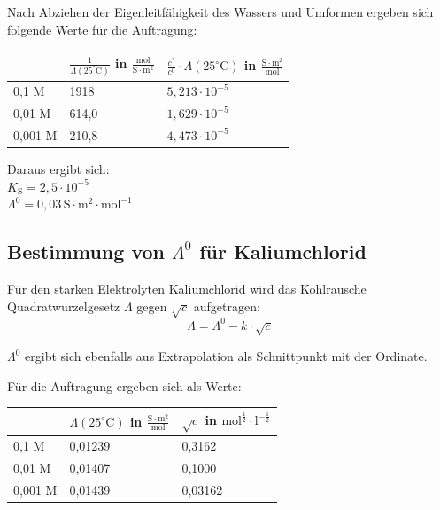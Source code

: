 \documentclass[12pt,a4paper,titlepage,headinclude,bibtotoc]{scrartcl}
\begin{document}
Nach Abziehen der Eigenleitfähigkeit des Wassers und Umformen ergeben sich folgende Werte für die Auftragung:\\

\begin{table} [h]
\centering 
\begin{tabular}{|p{4cm}||p{4cm}|p{4cm}|}
\hline
& $\frac{1}{\Lambda(25^\circ\text{C})}$ in $\frac{\mathrm{mol}}{\mathrm{S} \cdot \mathrm{m^2}}$ & $\frac{c^*}{c^0} \cdot \Lambda(25^\circ\text{C})$ in $\frac{\mathrm{S} \cdot \mathrm{m^2}}{\mathrm{mol}}$\\
\hline
0,1 M & 1918 & $5,213 \cdot 10^{-5}$  \\
\hline
0,01 M & 614,0 & $1,629 \cdot 10^{-5}$  \\
\hline
0,001 M & 210,8 & $4,473 \cdot 10^{-5}$ \\
\hline
\end{tabular}
\end{table}

Daraus ergibt sich:\\

$K_{\mathrm{S}} = 2,5 \cdot 10^{-5}$\\
$\Lambda^0 = 0,03\, \mathrm{S} \cdot \mathrm{m^2} \cdot \mathrm{mol^{-1}}$\\





\subsection{Bestimmung von $\Lambda^0$ für Kaliumchlorid}

Für den starken Elektrolyten Kaliumchlorid wird das Kohlrausche Quadratwurzelgesetz $\Lambda$ gegen $\sqrt{c}$ aufgetragen:\\

\begin{equation}
\Lambda = \Lambda^0 - k \cdot \sqrt{c}
\end{equation}

$\Lambda^0$ ergibt sich ebenfalls aus Extrapolation als Schnittpunkt mit der Ordinate.

Für die Auftragung ergeben sich als Werte:\\


\begin{table} [h]
\centering 
\begin{tabular}{|p{4cm}||p{4cm}|p{4cm}|}
\hline
& $\Lambda(25^\circ\text{C})$ in $\frac{\mathrm{S} \cdot \mathrm{m^2}}{\mathrm{mol}}$ & $\sqrt{c}$ in $\mathrm{mol^{\frac{1}{2}}} \cdot \mathrm{l^{- \frac{1}{2}}}$\\
\hline
0,1 M & 0,01239 & 0,3162 \\
\hline
0,01 M & 0,01407 & 0,1000 \\
\hline
0,001 M & 0,01439 & 0,03162 \\
\hline
\end{tabular}
\end{table}
\end{document}

